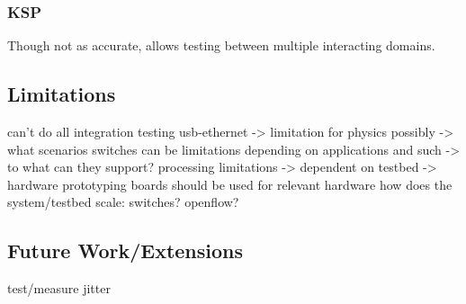\subsubsection{KSP}
Though not as accurate, allows testing between multiple interacting domains.

\subsection{Limitations}
can't do all integration testing
usb-ethernet -> limitation for physics possibly -> what scenarios
switches can be limitations depending on applications and such -> to what can they support?
processing limitations -> dependent on testbed -> hardware prototyping boards should be used for relevant hardware
how does the system/testbed scale: switches? openflow?

\subsection{Future Work/Extensions}
test/measure jitter